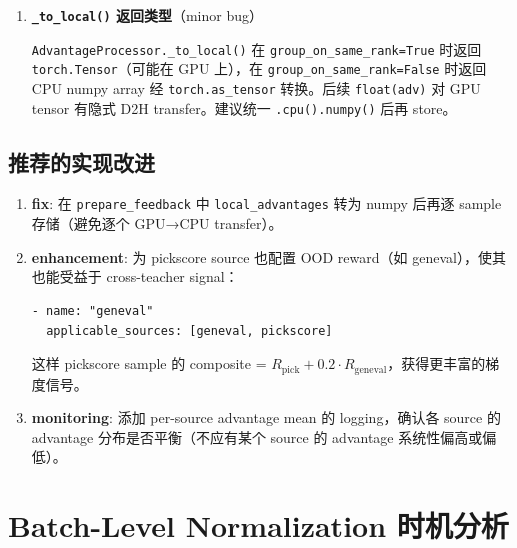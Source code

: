 \documentclass[11pt,a4paper]{article}
\theoremstyle{definition}
\begin{document}
\begin{enumerate}[leftmargin=1.5em]
两者的原始 scale 不同。但由于 group-mean 是\textbf{组内}计算（同一 prompt $\Rightarrow$ 同一 source $\Rightarrow$ 同一 composite 公式），且 group-std 归一化后 scale 对齐，这\textbf{不是问题}。

\item \textbf{\texttt{\_to\_local()} 返回类型}（minor bug）

\texttt{AdvantageProcessor.\_to\_local()} 在 \texttt{group\_on\_same\_rank=True} 时返回 \texttt{torch.Tensor}（可能在 GPU 上），在 \texttt{group\_on\_same\_rank=False} 时返回 CPU numpy array 经 \texttt{torch.as\_tensor} 转换。后续 \texttt{float(adv)} 对 GPU tensor 有隐式 D2H transfer。建议统一 \texttt{.cpu().numpy()} 后再 store。

\end{enumerate}

\subsection{推荐的实现改进}

\begin{tcolorbox}[colback=green!5, colframe=green!50!black, title=短期可执行的改进]
\begin{enumerate}[leftmargin=1.5em]
\item \textbf{fix}: 在 \texttt{prepare\_feedback} 中 \texttt{local\_advantages} 转为 numpy 后再逐 sample 存储（避免逐个 GPU→CPU transfer）。

\item \textbf{enhancement}: 为 pickscore source 也配置 OOD reward（如 geneval），使其也能受益于 cross-teacher signal：
\begin{verbatim}
- name: "geneval"
  applicable_sources: [geneval, pickscore]
\end{verbatim}
这样 pickscore sample 的 composite = $R_{\mathrm{pick}} + 0.2 \cdot R_{\mathrm{geneval}}$，获得更丰富的梯度信号。

\item \textbf{monitoring}: 添加 per-source advantage mean 的 logging，确认各 source 的 advantage 分布是否平衡（不应有某个 source 的 advantage 系统性偏高或偏低）。
\end{enumerate}
\end{tcolorbox}

\section{Batch-Level Normalization 时机分析}
\label{sec:norm_timing}
\end{document}
